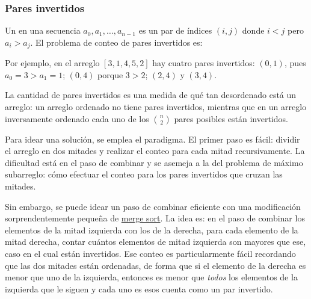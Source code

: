 \subsubsection{Pares invertidos}
\label{sec:pares_invertidos}

Un  en una secuencia \(a_0, a_1, \ldots, a_{n-1}\) es un par de índices \((i, j)\) donde \(i < j\) pero \(a_i > a_j\). El problema de conteo de pares invertidos es:
\begin{especificacion}
\end{especificacion}
Por ejemplo, en el arreglo \([3, 1, 4, 5, 2]\) hay cuatro pares invertidos: \((0, 1)\), pues \(a_0 = 3 > a_1 = 1\); \((0, 4)\) porque \(3 > 2\); \((2, 4)\) y \((3, 4)\). 

La cantidad de pares invertidos es una medida de qué tan desordenado está un arreglo: un arreglo ordenado no tiene pares invertidos, mientras que en un arreglo inversamente ordenado cada uno de los \(\binom{n}{2}\) pares posibles están invertidos.

Para idear una solución, se emplea el paradigma. El primer paso es fácil: dividir el arreglo en dos mitades y realizar el conteo para cada mitad recursivamente. La dificultad está en el paso de combinar y se asemeja a la del problema de máximo subarreglo: cómo efectuar el conteo para los pares invertidos que cruzan las mitades.

Sin embargo, se puede idear un paso de combinar eficiente con una modificación sorprendentemente pequeña de \hyperref[sec:merge_sort]{merge sort}. La idea es: en el paso de combinar los elementos de la mitad izquierda con los de la derecha, para cada elemento de la mitad derecha, contar cuántos elementos de mitad izquierda son mayores que ese, caso en el cual están invertidos. Ese conteo es particularmente fácil recordando que las dos mitades están ordenadas, de forma que si el elemento de la derecha es menor que uno de la izquierda, entonces es menor que \emph{todos} los elementos de la izquierda que le siguen y cada uno es esos cuenta como un par invertido.

